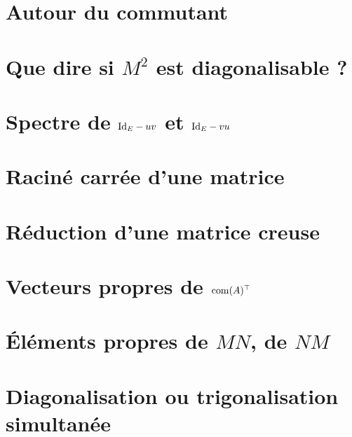 \section{Autour du commutant}


\section{Que dire si \texorpdfstring{$M^2$}{M^2} est diagonalisable ?}


\section{Spectre de \texorpdfstring{$\mathrm{Id}_E-uv$ et $\mathrm{Id}_E-vu$}{IdE-uv et IdE - vu}} \label{spectre_I-uv_et_I-vu}


\section{Raciné carrée d'une matrice}


\section{Réduction d'une matrice creuse}


\section{Vecteurs propres de $\mathrm{com}(A)^\top$}


\section{Éléments propres de $MN$, de $NM$}


\section{Diagonalisation ou trigonalisation simultanée}


